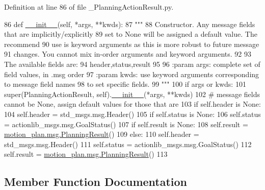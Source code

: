 Definition at line 86 of file \+\_\+\+Planning\+Action\+Result.\+py.


\begin{DoxyCode}
86   \textcolor{keyword}{def }\hyperlink{classstate__machine_1_1Play_a5993a23d8be7f7b2647f71ede0334957}{\_\_init\_\_}(self, *args, **kwds):
87     \textcolor{stringliteral}{"""}
88 \textcolor{stringliteral}{    Constructor. Any message fields that are implicitly/explicitly}
89 \textcolor{stringliteral}{    set to None will be assigned a default value. The recommend}
90 \textcolor{stringliteral}{    use is keyword arguments as this is more robust to future message}
91 \textcolor{stringliteral}{    changes.  You cannot mix in-order arguments and keyword arguments.}
92 \textcolor{stringliteral}{}
93 \textcolor{stringliteral}{    The available fields are:}
94 \textcolor{stringliteral}{       header,status,result}
95 \textcolor{stringliteral}{}
96 \textcolor{stringliteral}{    :param args: complete set of field values, in .msg order}
97 \textcolor{stringliteral}{    :param kwds: use keyword arguments corresponding to message field names}
98 \textcolor{stringliteral}{    to set specific fields.}
99 \textcolor{stringliteral}{    """}
100     \textcolor{keywordflow}{if} args \textcolor{keywordflow}{or} kwds:
101       super(PlanningActionResult, self).\hyperlink{classstate__machine_1_1Play_a5993a23d8be7f7b2647f71ede0334957}{\_\_init\_\_}(*args, **kwds)
102       \textcolor{comment}{# message fields cannot be None, assign default values for those that are}
103       \textcolor{keywordflow}{if} self.header \textcolor{keywordflow}{is} \textcolor{keywordtype}{None}:
104         self.header = std\_msgs.msg.Header()
105       \textcolor{keywordflow}{if} self.status \textcolor{keywordflow}{is} \textcolor{keywordtype}{None}:
106         self.status = actionlib\_msgs.msg.GoalStatus()
107       \textcolor{keywordflow}{if} self.result \textcolor{keywordflow}{is} \textcolor{keywordtype}{None}:
108         self.result = \hyperlink{classmotion__plan_1_1msg_1_1__PlanningResult_1_1PlanningResult}{motion\_plan.msg.PlanningResult}()
109     \textcolor{keywordflow}{else}:
110       self.header = std\_msgs.msg.Header()
111       self.status = actionlib\_msgs.msg.GoalStatus()
112       self.result = \hyperlink{classmotion__plan_1_1msg_1_1__PlanningResult_1_1PlanningResult}{motion\_plan.msg.PlanningResult}()
113 
\end{DoxyCode}


\subsection{Member Function Documentation}
\mbox{\label{classmotion__plan_1_1msg_1_1__PlanningActionResult_1_1PlanningActionResult_a0b2540ac8f4bafdab0dd61946a2790a0}} 
